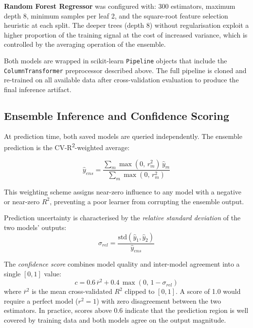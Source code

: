 \textbf{Random Forest Regressor} was configured with: 300 estimators, maximum
depth 8, minimum samples per leaf 2, and the square-root feature selection
heuristic at each split.
The deeper trees (depth 8) without regularisation exploit a higher proportion
of the training signal at the cost of increased variance, which is controlled
by the averaging operation of the ensemble.

Both models are wrapped in scikit-learn \texttt{Pipeline} objects that include
the \texttt{ColumnTransformer} preprocessor described above.
The full pipeline is cloned and re-trained on all available data after
cross-validation evaluation to produce the final inference artifact.

\subsection{Ensemble Inference and Confidence Scoring}\label{sec:ensemble}

At prediction time, both saved models are queried independently.
The ensemble prediction is the CV-R\textsuperscript{2}-weighted average:

\begin{equation}
  \hat{y}_{ens} =
    \frac{\displaystyle\sum_{m} \max(0,\,r^2_m)\,\hat{y}_m}
         {\displaystyle\sum_{m} \max(0,\,r^2_m)}
  \label{eq:ensemble}
\end{equation}

This weighting scheme assigns near-zero influence to any model with a negative
or near-zero $R^2$, preventing a poor learner from corrupting the ensemble output.

Prediction uncertainty is characterised by the \emph{relative standard deviation}
of the two models' outputs:
\begin{equation}
  \sigma_{rel} = \frac{\mathrm{std}(\hat{y}_1,\hat{y}_2)}{\hat{y}_{ens}}
\end{equation}

The \emph{confidence score} combines model quality and inter-model agreement
into a single $[0,1]$ value:
\begin{equation}
  c = 0.6\,\bar{r}^2 + 0.4\,\max\!\left(0,\,1 - \sigma_{rel}\right)
  \label{eq:confidence}
\end{equation}
where $\bar{r}^2$ is the mean cross-validated $R^2$ clipped to $[0,1]$.
A score of 1.0 would require a perfect model ($r^2 = 1$) with zero disagreement
between the two estimators.
In practice, scores above 0.6 indicate that the prediction region is well covered
by training data and both models agree on the output magnitude.

